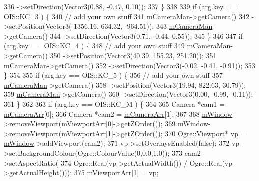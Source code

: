 \begin{DoxyCode}
336             ->setDirection(Vector3(0.88, -0.47, 0.10));
337     \}
338 
339     \textcolor{keywordflow}{if} (arg.key == OIS::KC\_3 ) \{
340         \textcolor{comment}{// add your own stuff}
341         \hyperlink{class_base_application_a9ae38dea6316058549151fff66a91fcd}{mCameraMan}->getCamera()
342             ->setPosition(Vector3(-1356.16, 634.32, -964.51));
343         \hyperlink{class_base_application_a9ae38dea6316058549151fff66a91fcd}{mCameraMan}->getCamera()
344             ->setDirection(Vector3(0.71,    -0.44,  0.55));
345     \}
346 
347     \textcolor{keywordflow}{if} (arg.key == OIS::KC\_4 ) \{
348          \textcolor{comment}{// add your own stuff}
349         \hyperlink{class_base_application_a9ae38dea6316058549151fff66a91fcd}{mCameraMan}->getCamera()
350             ->setPosition(Vector3(40.39,    155.23, 251.20));
351         \hyperlink{class_base_application_a9ae38dea6316058549151fff66a91fcd}{mCameraMan}->getCamera()
352             ->setDirection(Vector3(-0.02,   -0.41,  -0.91));
353     \}
354 
355     \textcolor{keywordflow}{if} (arg.key == OIS::KC\_5 ) \{
356         \textcolor{comment}{// add your own stuff}
357         \hyperlink{class_base_application_a9ae38dea6316058549151fff66a91fcd}{mCameraMan}->getCamera()
358             ->setPosition(Vector3(19.94,    822.63, 30.79));
359         \hyperlink{class_base_application_a9ae38dea6316058549151fff66a91fcd}{mCameraMan}->getCamera()
360             ->setDirection(Vector3(0.00,    -0.99,  -0.11));
361     \}
362 
363     \textcolor{keywordflow}{if} (arg.key == OIS::KC\_M ) \{
364         
365        Camera *cam1 = \hyperlink{class_basic_tutorial__00_af8d457d912286a98c0975c52d4faf910}{mCameraArr}[0];
366        Camera *cam2 = \hyperlink{class_basic_tutorial__00_af8d457d912286a98c0975c52d4faf910}{mCameraArr}[1];
367 
368        \hyperlink{class_base_application_ac5d8e9c81e036897bc82f81eff8c570f}{mWindow}->removeViewport(\hyperlink{class_basic_tutorial__00_a6676a92b50e9b43634d4c66488537b73}{mViewportArr}[0]->getZOrder());
369        \hyperlink{class_base_application_ac5d8e9c81e036897bc82f81eff8c570f}{mWindow}->removeViewport(\hyperlink{class_basic_tutorial__00_a6676a92b50e9b43634d4c66488537b73}{mViewportArr}[1]->getZOrder());
370     Ogre::Viewport* vp = \hyperlink{class_base_application_ac5d8e9c81e036897bc82f81eff8c570f}{mWindow}->addViewport(cam2);
371     vp->setOverlaysEnabled(\textcolor{keyword}{false});
372     vp->setBackgroundColour(Ogre::ColourValue(0,0.0,1.0));
373     cam2->setAspectRatio(
374         Ogre::Real(vp->getActualWidth()) / Ogre::Real(vp->getActualHeight()));
375     \hyperlink{class_basic_tutorial__00_a6676a92b50e9b43634d4c66488537b73}{mViewportArr}[1] = vp;

\end{DoxyCode}
